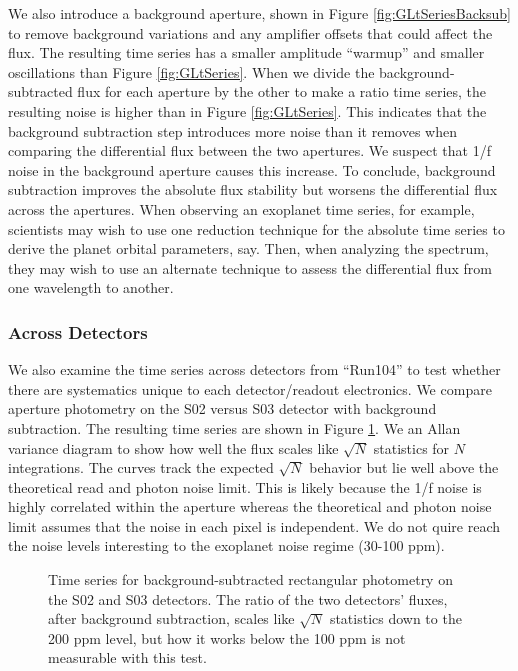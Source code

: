 \documentclass{aastex62}
\begin{document}
We also introduce a background aperture, shown in Figure \ref{fig:GLtSeriesBacksub} to remove background variations and any amplifier offsets that could affect the flux.
The resulting time series has a smaller amplitude ``warmup'' and smaller oscillations than Figure \ref{fig:GLtSeries}.
When we divide the background-subtracted flux for each aperture by the other to make a ratio time series, the resulting noise is higher than in Figure \ref{fig:GLtSeries}.
This indicates that the background subtraction step introduces more noise than it removes when comparing the differential flux between the two apertures.
We suspect that 1/f noise in the background aperture causes this increase.
To conclude, background subtraction improves the absolute flux stability but worsens the differential flux across the apertures.
When observing an exoplanet time series, for example, scientists may wish to use one reduction technique for the absolute time series to derive the planet orbital parameters, say.
Then, when analyzing the spectrum, they may wish to use an alternate technique to assess the differential flux from one wavelength to another.

\subsubsection{Across Detectors}
We also examine the time series across detectors from ``Run104'' to test whether there are systematics unique to each detector/readout electronics.
We compare aperture photometry on the S02 versus S03 detector with background subtraction.
The resulting time series are shown in Figure \ref{fig:GLtSeriesAcrossDetectors}.
We an Allan variance diagram to show how well the flux scales like $\sqrt{N}$ statistics for $N$ integrations.
The curves track the expected $\sqrt{N}$ behavior but lie well above the theoretical read and photon noise limit.
This is likely because the 1/f noise is highly correlated within the aperture whereas the theoretical and photon noise limit assumes that the noise in each pixel is independent.
We do not quire reach the noise levels interesting to the exoplanet noise regime (30-100 ppm).

\begin{figure}
\caption{Time series for background-subtracted rectangular photometry on the S02 and S03 detectors.
The ratio of the two detectors' fluxes, after background subtraction, scales like $\sqrt{N}$ statistics down to the 200 ppm level, but how it works below the 100 ppm is not measurable with this test.}\label{fig:GLtSeriesAcrossDetectors}
\end{figure}
\end{document}
